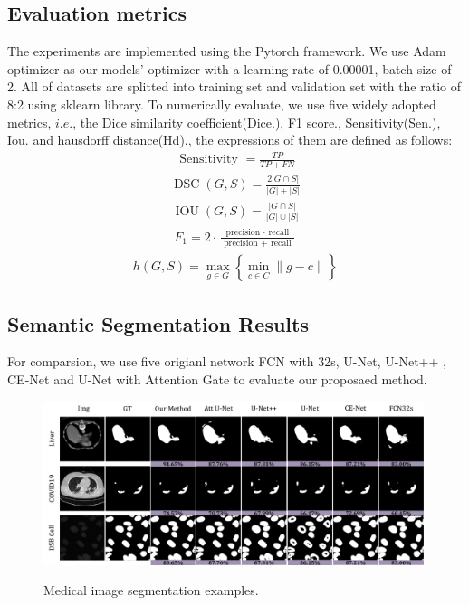 \documentclass[UTF8]{article} %
\begin{document}
\subsection{Evaluation metrics}
The experiments are implemented using the Pytorch framework. We use Adam optimizer\cite{Adam} as our
models' optimizer with a learning rate of 0.00001, batch size of 2. All of datasets are splitted into training set and validation set with 
the ratio of 8:2 using sklearn library. To numerically evaluate, we use five widely adopted metrics, \(i.e.\),
the Dice similarity coefficient(Dice.), F1 score., Sensitivity(Sen.), Iou. and hausdorff distance(Hd)., the expressions of them are defined as follows:
\begin{align}
  \text { Sensitivity }=\frac{T P}{T P+F N}
\end{align}
\begin{align}
  \operatorname{DSC}(G, S)=\frac{2|G \cap S|}{|G|+|S|}
\end{align}
\begin{align}
  \operatorname{IOU}(G, S)=\frac{|G \cap S|}{|G| \cup|S|}
\end{align}
\begin{align}
  F_{1}=2 \cdot \frac{\text { precision } \cdot \text { recall }}{\text { precision }+\text { recall }}
\end{align}
\begin{align}
  h(G, S)=\max _{g \in G}\left\{\min _{c \in C}\|g-c\|\right\}
\end{align}
\subsection{Semantic Segmentation Results}
For comparsion, we use five origianl network FCN with 32s\cite{fcn}, U-Net\cite{unet}, U-Net++\cite{unet++} , CE-Net\cite{cenet} and U-Net with Attention Gate\cite{attentiongate}
to evaluate our proposaed method.
\begin{figure}[ht]
  \begin{center}
  \includegraphics[width=0.99\textwidth]{result.pdf}
  \vspace{-2mm}
  \caption{Medical image segmentation examples.} 
  \vspace{-2mm}
  \label{fig:result}
  \end{center}
  \vspace{-0.35cm}
\end{figure}
\end{document}
